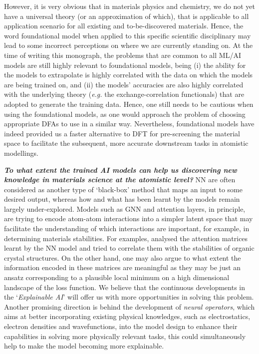 However, it is very obvious that in materials physics and chemistry, we do not yet have a universal theory (or an approximation of which), that is applicable to all application scenario for all existing and to-be-discovered materials. Hence, the word foundational model when applied to this specific scientific disciplinary may lead to some incorrect perceptions on where we are currently standing on.  At the time of writing this monograph, the problems that are common to all ML/AI models are still highly relevant to foundational models, being (i) the ability for the models to extrapolate is highly correlated with the data on which the models are being trained on,\cite{yang2026mace,fu2022forces} and (ii) the models' accuracies are also highly correlated with the underlying theory (\emph{e.g.} the exchange-correlation functionals\cite{shi2026influence}) that are adopted to generate the training data. Hence, one still needs to be cautious when using the foundational models, as one would approach the problem of choosing appropriate DFAs to use in a similar way. Nevertheless, foundational models have indeed provided us a faster alternative to DFT for pre-screening the material space to facilitate the subsequent, more accurate downstream  tasks in atomistic modellings.

\textbf{\emph{To what extent the trained AI models can help us discovering new knowledge in materials science at the atomistic level?}}
NN are often considered as another type of `black-box' method that maps an input to some desired output, whereas how and what has been learnt by the models remain largely under-explored. Models such as GNN\cite{duval2023hitchhiker} and attention layers,\cite{vaswani2017attention} in principle, are trying to encode atom-atom interactions into a simpler latent space that may facilitate the understanding of which interactions are important, for example, in determining materials stabilities. For examples, \citet{hafizi2026towards} analysed the attention matrices learnt by the NN model and tried to correlate them with the stabilities of organic crystal structures.
On the other hand, one may also argue to what extent the information encoded in these matrices are meaningful as they may be just  an ansatz corresponding to a plausible local minimum on a high dimensional landscape of the loss function. We believe that the continuous developments in the `\emph{Explainable AI}'\cite{minh2022explainable} will offer us with more opportunities in solving this problem. Another promising direction is behind the development of \emph{neural operators},\cite{azizzadenesheli2024neural} which aims at better incorporating existing physical knowledges, such as electrostatics, electron densities and wavefunctions, into the model design to enhance their capabilities in solving more physically relevant tasks, this could simultaneously help to make the model becoming more explainable. 

